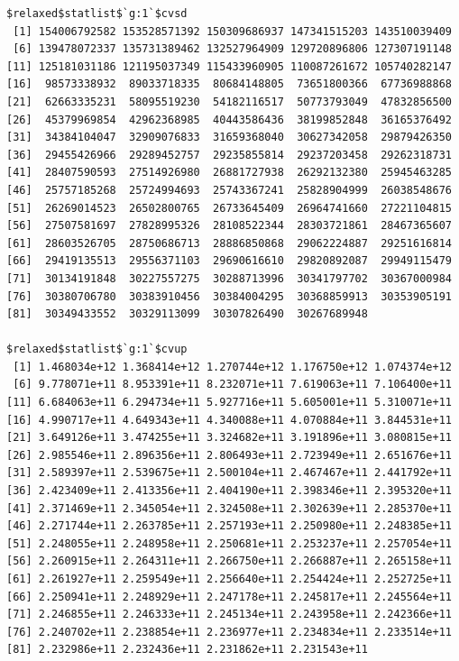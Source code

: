 \documentclass[
]{article}
\begin{document}
\begin{verbatim}
$relaxed$statlist$`g:1`$cvsd
 [1] 154006792582 153528571392 150309686937 147341515203 143510039409
 [6] 139478072337 135731389462 132527964909 129720896806 127307191148
[11] 125181031186 121195037349 115433960905 110087261672 105740282147
[16]  98573338932  89033718335  80684148805  73651800366  67736988868
[21]  62663335231  58095519230  54182116517  50773793049  47832856500
[26]  45379969854  42962368985  40443586436  38199852848  36165376492
[31]  34384104047  32909076833  31659368040  30627342058  29879426350
[36]  29455426966  29289452757  29235855814  29237203458  29262318731
[41]  28407590593  27514926980  26881727938  26292132380  25945463285
[46]  25757185268  25724994693  25743367241  25828904999  26038548676
[51]  26269014523  26502800765  26733645409  26964741660  27221104815
[56]  27507581697  27828995326  28108522344  28303721861  28467365607
[61]  28603526705  28750686713  28886850868  29062224887  29251616814
[66]  29419135513  29556371103  29690616610  29820892087  29949115479
[71]  30134191848  30227557275  30288713996  30341797702  30367000984
[76]  30380706780  30383910456  30384004295  30368859913  30353905191
[81]  30349433552  30329113099  30307826490  30267689948

$relaxed$statlist$`g:1`$cvup
 [1] 1.468034e+12 1.368414e+12 1.270744e+12 1.176750e+12 1.074374e+12
 [6] 9.778071e+11 8.953391e+11 8.232071e+11 7.619063e+11 7.106400e+11
[11] 6.684063e+11 6.294734e+11 5.927716e+11 5.605001e+11 5.310071e+11
[16] 4.990717e+11 4.649343e+11 4.340088e+11 4.070884e+11 3.844531e+11
[21] 3.649126e+11 3.474255e+11 3.324682e+11 3.191896e+11 3.080815e+11
[26] 2.985546e+11 2.896356e+11 2.806493e+11 2.723949e+11 2.651676e+11
[31] 2.589397e+11 2.539675e+11 2.500104e+11 2.467467e+11 2.441792e+11
[36] 2.423409e+11 2.413356e+11 2.404190e+11 2.398346e+11 2.395320e+11
[41] 2.371469e+11 2.345054e+11 2.324508e+11 2.302639e+11 2.285370e+11
[46] 2.271744e+11 2.263785e+11 2.257193e+11 2.250980e+11 2.248385e+11
[51] 2.248055e+11 2.248958e+11 2.250681e+11 2.253237e+11 2.257054e+11
[56] 2.260915e+11 2.264311e+11 2.266750e+11 2.266887e+11 2.265158e+11
[61] 2.261927e+11 2.259549e+11 2.256640e+11 2.254424e+11 2.252725e+11
[66] 2.250941e+11 2.248929e+11 2.247178e+11 2.245817e+11 2.245564e+11
[71] 2.246855e+11 2.246333e+11 2.245134e+11 2.243958e+11 2.242366e+11
[76] 2.240702e+11 2.238854e+11 2.236977e+11 2.234834e+11 2.233514e+11
[81] 2.232986e+11 2.232436e+11 2.231862e+11 2.231543e+11


\end{verbatim}
\end{document}
